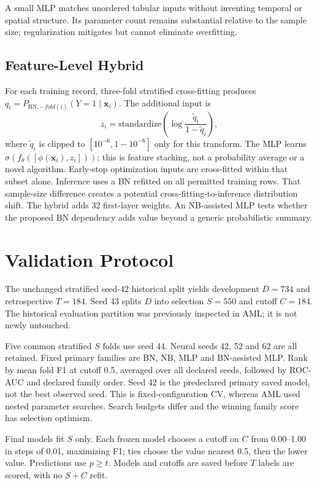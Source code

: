 \documentclass[conference]{IEEEtran}
\begin{document}
A small MLP matches unordered tabular inputs without inventing temporal or spatial structure. Its parameter count remains substantial relative to the sample size; regularization mitigates but cannot eliminate overfitting.
\subsection{Feature-Level Hybrid}
For each training record, three-fold stratified cross-fitting produces $q_i=P_{\mathrm{BN},-fold(i)}(Y=1\mid\mathbf x_i)$. The additional input is
\begin{equation}
z_i=\mathrm{standardize}\!\left(\log\frac{\widetilde q_i}{1-\widetilde q_i}\right),
\end{equation}
where $\widetilde q_i$ is clipped to $[10^{-6},1-10^{-6}]$ only for this transform. The MLP learns $\sigma(f_\theta([\phi(\mathbf x_i),z_i]))$; this is feature stacking, not a probability average or a novel algorithm. Early-stop optimization inputs are cross-fitted within that subset alone. Inference uses a BN refitted on all permitted training rows. That sample-size difference creates a potential cross-fitting-to-inference distribution shift. The hybrid adds 32 first-layer weights. An NB-assisted MLP tests whether the proposed BN dependency adds value beyond a generic probabilistic summary.
\section{Validation Protocol}
The unchanged stratified seed-42 historical split yields development $D=734$ and retrospective $T=184$. Seed 43 splits $D$ into selection $S=550$ and cutoff $C=184$. The historical evaluation partition was previously inspected in AML; it is not newly untouched.

Five common stratified $S$ folds use seed 44. Neural seeds 42, 52 and 62 are all retained. Fixed primary families are BN, NB, MLP and BN-assisted MLP. Rank by mean fold F1 at cutoff 0.5, averaged over all declared seeds, followed by ROC-AUC and declared family order. Seed 42 is the predeclared primary saved model, not the best observed seed. This is fixed-configuration CV, whereas AML used nested parameter searches. Search budgets differ and the winning family score has selection optimism.

Final models fit $S$ only. Each frozen model chooses a cutoff on $C$ from 0.00--1.00 in steps of 0.01, maximizing F1; ties choose the value nearest 0.5, then the lower value. Predictions use $p\geq t$. Models and cutoffs are saved before $T$ labels are scored, with no $S+C$ refit.
\end{document}
